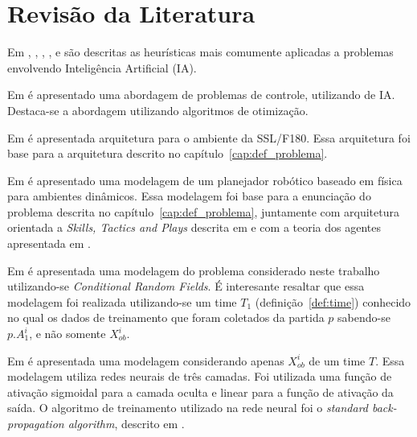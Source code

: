 \chapter{Revisão da Literatura}\label{cap:rev_bibliografica}


Em \cite{russellnorvig}, \cite{haykin2001redes}, \cite{kosko1997fuzzy}, \cite{passos2005datamining},
\cite{doringo2004ant} e \cite{bertsimas1993simulated} são descritas as heurísticas
mais comumente aplicadas a problemas envolvendo Inteligência Artificial (IA).

Em \cite{yoneyama2004ia} é apresentado uma abordagem de problemas de controle, utilizando de IA\@. Destaca-se
a abordagem utilizando algoritmos de otimização.

Em \cite{felixnavarro} é apresentada arquitetura para o ambiente da SSL/F180. Essa arquitetura foi base
para a arquitetura descrito no capítulo~\ref{cap:def_problema}.

Em \cite{zickler} é apresentado uma modelagem de um planejador robótico baseado em física para ambientes dinâmicos. 
Essa modelagem foi base para a enunciação do problema descrita no capítulo~\ref{cap:def_problema}, juntamente com 
arquitetura orientada a \textit{Skills, Tactics and Plays} descrita em \cite{bowling2003plays} e com a teoria dos 
agentes apresentada em \cite{russellnorvig}.

Em \cite{vail2008crf} é apresentada uma modelagem do problema considerado neste trabalho
utilizando-se \textit{Conditional Random Fields}. É interesante resaltar que essa modelagem
foi realizada utilizando-se um time $T_1$ (definição~\ref{def:time}) conhecido no qual os dados
de treinamento que foram coletados da partida $p$ sabendo-se $p.A_1^{i}$, e não somente $X_{ob}^{i}$.

Em \cite{sheng2005motionprediction} é apresentada uma modelagem considerando apenas $X_{ob}^{i}$
de um time $T$. Essa modelagem utiliza redes neurais de três camadas. Foi utilizada
uma função de ativação sigmoidal para a camada oculta e linear para a função de 
ativação da saída. O algoritmo de treinamento utilizado na rede neural foi o \textit{standard back-propagation
algorithm}, descrito em \cite{haykin2001redes}.
